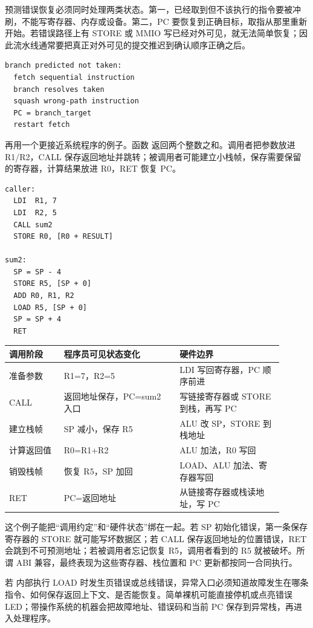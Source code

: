 预测错误恢复必须同时处理两类状态。第一，已经取到但不该执行的指令要被冲刷，不能写寄存器、内存或设备。第二，PC 要恢复到正确目标，取指从那里重新开始。若错误路径上有 STORE 或 MMIO 写已经对外可见，就无法简单恢复；因此流水线通常要把真正对外可见的提交推迟到确认顺序正确之后。

\begin{lstlisting}
branch predicted not taken:
  fetch sequential instruction
  branch resolves taken
  squash wrong-path instruction
  PC = branch_target
  restart fetch
\end{lstlisting}

再用一个更接近系统程序的例子。函数  返回两个整数之和。调用者把参数放进 R1/R2，CALL 保存返回地址并跳转；被调用者可能建立小栈帧，保存需要保留的寄存器，计算结果放进 R0，RET 恢复 PC。

\begin{lstlisting}
caller:
  LDI  R1, 7
  LDI  R2, 5
  CALL sum2
  STORE R0, [R0 + RESULT]

sum2:
  SP = SP - 4
  STORE R5, [SP + 0]
  ADD R0, R1, R2
  LOAD R5, [SP + 0]
  SP = SP + 4
  RET
\end{lstlisting}

\begin{longtable}{L{0.18\linewidth}L{0.38\linewidth}L{0.34\linewidth}}
\toprule
调用阶段 & 程序员可见状态变化 & 硬件边界 \\
\midrule
准备参数 & R1=7，R2=5 & LDI 写回寄存器，PC 顺序前进 \\
CALL & 返回地址保存，PC=sum2 入口 & 写链接寄存器或 STORE 到栈，再写 PC \\
建立栈帧 & SP 减小，保存 R5 & ALU 改 SP，STORE 到栈地址 \\
计算返回值 & R0=R1+R2 & ALU 加法，R0 写回 \\
销毁栈帧 & 恢复 R5，SP 加回 & LOAD、ALU 加法、寄存器写回 \\
RET & PC=返回地址 & 从链接寄存器或栈读地址，写 PC \\
\bottomrule
\end{longtable}

这个例子能把“调用约定”和“硬件状态”绑在一起。若 SP 初始化错误，第一条保存寄存器的 STORE 就可能写坏数据区；若 CALL 保存返回地址的位置错误，RET 会跳到不可预测地址；若被调用者忘记恢复 R5，调用者看到的 R5 就被破坏。所谓 ABI 兼容，最终表现为这些寄存器、栈位置和 PC 更新都按同一合同执行。

若  内部执行 LOAD 时发生页错误或总线错误，异常入口必须知道故障发生在哪条指令、如何保存返回上下文、是否能恢复。简单裸机可能直接停机或点亮错误 LED；带操作系统的机器会把故障地址、错误码和当前 PC 保存到异常栈，再进入处理程序。

